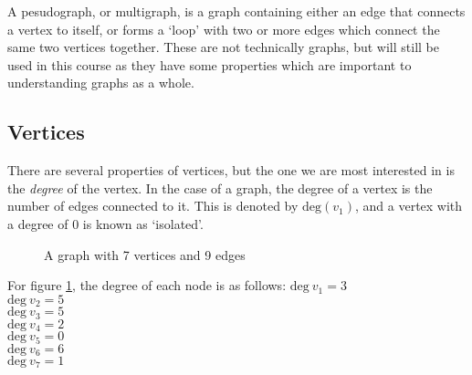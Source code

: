 A pesudograph, or multigraph, is a graph containing either an edge that connects a vertex to itself, or forms a `loop'
 with two or more edges which connect the same two vertices together. These are not technically graphs, but will still
 be used in this course as they have some properties which are important to understanding graphs as a whole.

\subsection*{Vertices}

There are several properties of vertices, but the one we are most interested in is the \textit{degree} of the vertex. In
 the case of a graph, the degree of a vertex is the number of edges connected to it. This is denoted by $\mathrm{deg}(v_1)$,
 and a vertex with a degree of $0$ is known as `isolated'.

\begin{minipage}[c]{0.35\linewidth}
  \begin{figure}[H]
    \centering
    \usetikzlibrary{graphs}
    \caption{A graph with 7 vertices and 9 edges}
    \label{fig:graph2}
  \end{figure}
\end{minipage}\hfill
\begin{minipage}{0.55\linewidth}
For figure \ref*{fig:graph2}, the degree of each node is as follows:
$\mathrm{deg\ } v_1 = 3$\\
$\mathrm{deg\ } v_2 = 5$\\
$\mathrm{deg\ } v_3 = 5$\\
$\mathrm{deg\ } v_4 = 2$\\
$\mathrm{deg\ } v_5 = 0$\\
$\mathrm{deg\ } v_6 = 6$\\
$\mathrm{deg\ } v_7 = 1$\\
\end{minipage}

